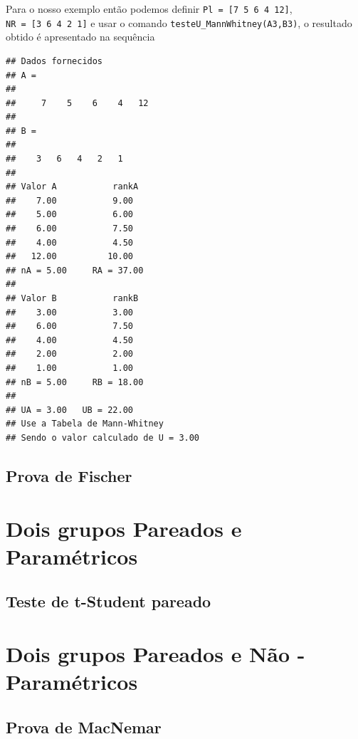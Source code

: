 \documentclass[
]{book}
\begin{document}
Para o nosso exemplo então podemos definir \texttt{Pl\ =\ {[}7\ 5\ 6\ 4\ 12{]}}, \texttt{NR\ =\ {[}3\ 6\ 4\ 2\ 1{]}} e usar o comando \texttt{testeU\_MannWhitney(A3,B3)}, o resultado obtido é apresentado na sequência

\begin{verbatim}
## Dados fornecidos
## A =
## 
##     7    5    6    4   12
## 
## B =
## 
##    3   6   4   2   1
## 
## Valor A           rankA
##    7.00           9.00
##    5.00           6.00
##    6.00           7.50
##    4.00           4.50
##   12.00          10.00
## nA = 5.00     RA = 37.00
## 
## Valor B           rankB
##    3.00           3.00
##    6.00           7.50
##    4.00           4.50
##    2.00           2.00
##    1.00           1.00
## nB = 5.00     RB = 18.00
## 
## UA = 3.00   UB = 22.00
## Use a Tabela de Mann-Whitney
## Sendo o valor calculado de U = 3.00
\end{verbatim}

\hypertarget{prova-de-fischer}{%
\section{Prova de Fischer}\label{prova-de-fischer}}

\hypertarget{dois-grupos-pareados-e-paramuxe9tricos}{%
\chapter{Dois grupos Pareados e Paramétricos}\label{dois-grupos-pareados-e-paramuxe9tricos}}

\hypertarget{teste-de-t-student-pareado}{%
\section{Teste de t-Student pareado}\label{teste-de-t-student-pareado}}

\hypertarget{dois-grupos-pareados-e-nuxe3o---paramuxe9tricos}{%
\chapter{Dois grupos Pareados e Não - Paramétricos}\label{dois-grupos-pareados-e-nuxe3o---paramuxe9tricos}}

\hypertarget{prova-de-macnemar}{%
\section{Prova de MacNemar}\label{prova-de-macnemar}}
\end{document}

